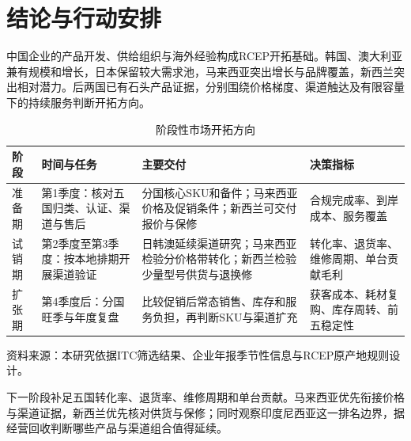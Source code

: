 \documentclass[UTF8,a4paper,12pt]{ctexart}
\begin{document}
\section{结论与行动安排}

中国企业的产品开发、供给组织与海外经验构成RCEP开拓基础。韩国、澳大利亚兼有规模和增长，日本保留较大需求池，马来西亚突出增长与品牌覆盖，新西兰突出相对潜力。后两国已有石头产品证据，分别围绕价格梯度、渠道触达及有限容量下的持续服务判断开拓方向。

\begin{table}[H]
\centering
\caption{阶段性市场开拓方向}
\label{tab:roadmap}
\small
\begin{tabular}{p{2.0cm}p{3.6cm}p{5.1cm}p{3.1cm}}
\toprule
阶段 & 时间与任务 & 主要交付 & 决策指标\\
\midrule
准备期 & 第1季度：核对五国归类、认证、渠道与售后 & 分国核心SKU和备件；马来西亚价格及促销条件；新西兰可交付报价与保修 & 合规完成率、到岸成本、服务覆盖\\
试销期 & 第2季度至第3季度：按本地排期开展渠道验证 & 日韩澳延续渠道研究；马来西亚检验分价格带转化；新西兰检验少量型号供货与退换修 & 转化率、退货率、维修周期、单台贡献毛利\\
扩张期 & 第4季度后：分国旺季与年度复盘 & 比较促销后常态销售、库存和服务负担，再判断SKU与渠道扩充 & 获客成本、耗材复购、库存周转、前五稳定性\\
\bottomrule
\end{tabular}
\par\vspace{0.4em}
\begin{minipage}{0.92\textwidth}\small
资料来源：本研究依据ITC筛选结果、企业年报季节性信息与RCEP原产地规则设计。
\end{minipage}
\end{table}

下一阶段补足五国转化率、退货率、维修周期和单台贡献。马来西亚优先衔接价格与渠道证据，新西兰优先核对供货与保修；同时观察印度尼西亚这一排名边界，据经营回收判断哪些产品与渠道组合值得延续。

\begingroup
\sloppy
\theendnotes
\endgroup
\end{document}
